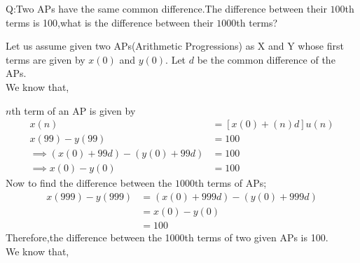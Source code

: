 \documentclass[journal,12pt,onecolumn]{IEEEtran}
\theoremstyle{remark}
\begin{document}
\let\vec\mathbf







\bigskip

\renewcommand{\thefigure}{\theenumi}
\renewcommand{\thetable}{\theenumi}

Q:Two APs have the same common difference.The difference between their $100${th} terms is 100,what is the difference between their $1000${th} terms?

\solution

Let us assume given two APs(Arithmetic Progressions) as X and Y whose first terms are given by $x(0)$ and $y(0)$. Let $d$ be the common difference of the APs. 
\\
We know that, 

$n$th term of an AP is given by 
\begin{align}
x(n) &= [x(0)+(n)d]u(n) \\
 x(99) - y(99) &= 100 \\
\implies (x(0) + 99d) - (y(0) + 99d) &= 100
 \\
\implies x(0) - y(0) &= 100
\end{align}
Now to find the difference between the $1000$th terms of APs;
\begin{align}
x(999) - y(999) &= (x(0) + 999d) - (y(0) + 999d)
\\
&= x(0) - y(0)\\
&= 100  
\end{align}
Therefore,the difference between the 1000th terms of two given APs is 100.\\

We know that,
\end{document}
